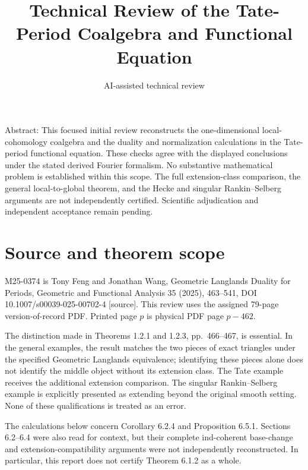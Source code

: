 \documentclass[10pt]{article}
\title{Technical Review of the Tate-Period Coalgebra and Functional Equation}
\author{AI-assisted technical review}
\date{}
\begin{document}
\maketitle
Abstract: This focused initial review reconstructs the one-dimensional local-cohomology coalgebra and the duality and normalization calculations in the Tate-period functional equation. These checks agree with the displayed conclusions under the stated derived Fourier formalism. No substantive mathematical problem is established within this scope. The full extension-class comparison, the general local-to-global theorem, and the Hecke and singular Rankin–Selberg arguments are not independently certified. Scientific adjudication and independent acceptance remain pending.\par
\section*{Source and theorem scope}
M25-0374 is Tony Feng and Jonathan Wang, Geometric Langlands Duality for Periods, Geometric and Functional Analysis 35 (2025), 463–541, DOI 10.1007/s00039-025-00702-4 [source]. This review uses the assigned 79-page version-of-record PDF. Printed page \(p\) is physical PDF page \(p-462\).\par
The distinction made in Theorems 1.2.1 and 1.2.3, pp. 466–467, is essential. In the general examples, the result matches the two pieces of exact triangles under the specified Geometric Langlands equivalence; identifying these pieces alone does not identify the middle object without its extension class. The Tate example receives the additional extension comparison. The singular Rankin–Selberg example is explicitly presented as extending beyond the original smooth setting. None of these qualifications is treated as an error.\par
The calculations below concern Corollary 6.2.4 and Proposition 6.5.1. Sections 6.2–6.4 were also read for context, but their complete ind-coherent base-change and extension-compatibility arguments were not independently reconstructed. In particular, this report does not certify Theorem 6.1.2 as a whole.\par
\end{document}
